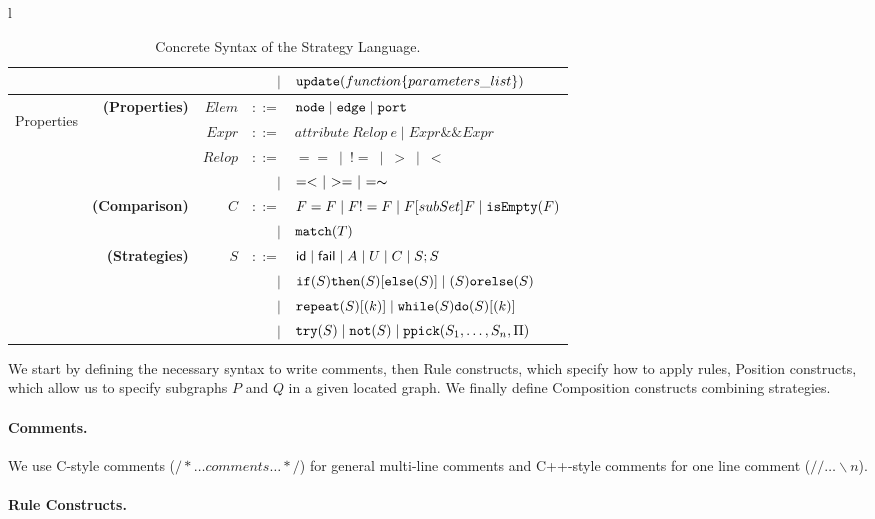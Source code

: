\documentclass[a4paper,10pt,runningheads]{llncs}
\newcommand{\ppick}[1]{{\tt ppick(}#1{\tt )}}
\newcommand{\Id}{{\sf id}}
\newcommand{\Fail}{{\sf fail}}
\newcommand{\isEmpty}[1]{{\tt isEmpty(}#1{\tt )}}
\newcommand{\Node}{{\tt node}}
\newcommand{\Edge}{{\tt edge}}
\newcommand{\Port}{{\tt port}}
\newcommand{\tmatch}[1]{{\tt match(}#1{\tt )}}
\newcommand{\orelse}[2]{(#1) {\tt orelse} (#2)}
\newcommand{\whiledoop}[3]{{\tt while(}#1{\tt )}{\tt do(}#2{\tt )}#3}
\newcommand{\repeatt}[1]{{\tt repeat(}#1{\tt )}}
\newcommand{\nott}[1]{{\tt not(}#1{\tt )}}
\newcommand{\try}[1]{{\tt try(}#1{\tt )}}
\newcommand{\set}[2]{{\tt update(}#1\{#2\}{\tt )}}
\begin{document}
\begin{center}
\begin{table}[!ht]
{\begin{tabular}{l}
\begin{tabular}{lrrrl}
&&& $\mid$ & $\set{function}{parameters\_list}$\\ 
 \hline
\multirow{5}{*}{\begin{sideways}Properties\end{sideways}} & {\bf (Properties)} & $Elem$ & $::=$ &  $\Node \mid \Edge \mid \Port$\\
& & $Expr$& $::=$ &  $  \textit{attribute} ~ Relop ~e \mid Expr \&\& Expr $\\
& & $Relop$ & $::=$ & $ == ~ \mid ~  != ~ \mid ~ > ~ \mid ~ < ~  $\\
& & & $\mid$ & $ =< ~ \mid ~ >= ~ \mid ~ =\thicksim ~$\\
\hline
\multirow{5}{*}{\begin{sideways}Compositions\end{sideways}} 
& {\bf (Comparison)} &  $C$ & $::=$ & $ F = F \mid F !=  F \mid F [subSet] F \mid \isEmpty{F} $\\
& & & $\mid$ & $\tmatch{T}$ \\
& {\bf (Strategies)}   &
 $S$ & $::=$ & $ \Id \mid \Fail \mid A \mid U \mid C \mid S ; S $ \\  
  & & & $\mid$ & ${\tt if(}S{\tt)then(}S{\tt )[else(}S{\tt )]} \mid \orelse{S}{S}$\\
 & & & $\mid$ & $ \repeatt{S}[(k)] \mid \whiledoop{S}{S}{[(k)]}$\\
  & & & $\mid$ & $ \try{S}  \mid \nott{S} \mid \ppick{S_1, \dots, S_n, \Pi} $\\
\end{tabular}
\end{tabular}
}
\caption{Concrete Syntax of the Strategy Language.}\label{tab:syntax-strategies}
\end{table}
\end{center}

We start by defining the necessary syntax to write comments, then Rule constructs, which specify  how to apply
rules, Position constructs, which allow us to
specify subgraphs $P$ and $Q$ in a given located graph. We finally define
Composition constructs combining strategies.

\paragraph{\bf Comments.}
We use C-style comments ($/* \ldots comments \ldots */$) for general multi-line comments and C++-style comments for one line comment ($// \ldots \backslash n$).

\paragraph{\bf Rule Constructs.}
\end{document}
